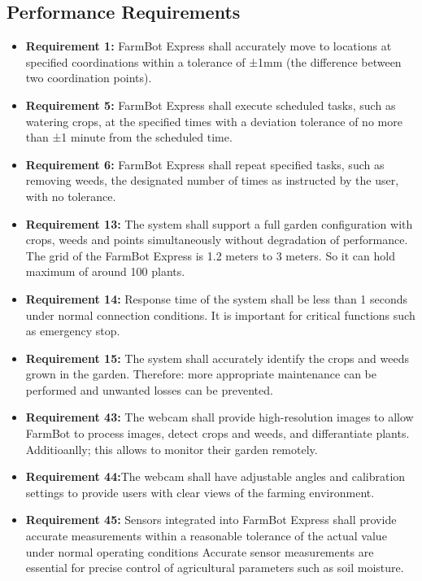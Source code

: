 \subsection{Performance Requirements}
\begin{itemize}
	\item \textbf{Requirement 1:} FarmBot Express shall accurately move to locations at specified coordinations within a tolerance of ±1mm (the difference between two coordination points).
	\item \textbf{Requirement 5:} FarmBot Express shall execute scheduled tasks, such as watering crops, at the specified times with a deviation tolerance of no more than ±1 minute from the scheduled time.
	\item \textbf{Requirement 6:} FarmBot Express shall repeat specified tasks, such as removing weeds, the designated number of times as instructed by the user, with no tolerance.
	\item \textbf {Requirement 13:} The system shall support a full garden configuration with crops, weeds and points simultaneously without degradation of performance. The grid of the FarmBot Express is 1.2 meters to 3 meters. So it can hold maximum of around 100 plants.
	\item \textbf {Requirement 14:} Response time of the system shall be less than 1 seconds under normal connection conditions. It is important for critical functions such as emergency stop.
	\item \textbf {Requirement 15:} The system shall accurately identify the crops and weeds grown in the garden. Therefore: more appropriate maintenance can be performed and unwanted losses can be prevented.
	\item \textbf{Requirement 43:} The webcam shall provide high-resolution images to allow FarmBot to process images, detect crops and weeds, and differantiate plants. Additioanlly; this allows to monitor their garden remotely.
	\item \textbf{Requirement 44:}The webcam shall have adjustable angles and calibration settings to provide users with clear views of the farming environment.
	\item \textbf{Requirement 45:} Sensors integrated into FarmBot Express shall provide accurate measurements within a reasonable tolerance of the actual value under normal operating conditions Accurate sensor measurements are essential for precise control of agricultural parameters such as soil moisture.
\end{itemize}

